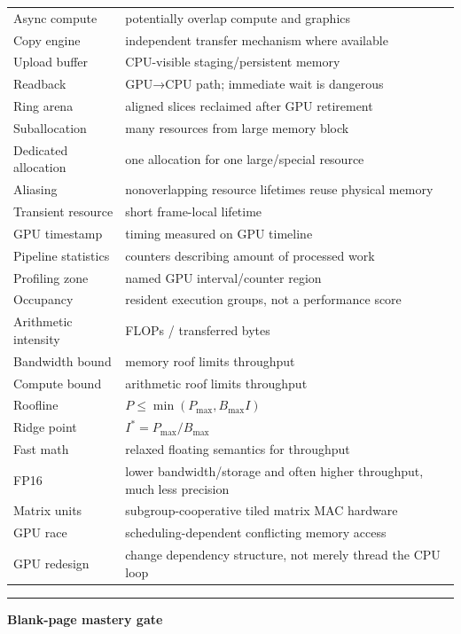 {\begin{longtable}[]{@{}
  >{\raggedright\arraybackslash}p{}
  >{\raggedright\arraybackslash}p{}@{}}
Async compute & potentially overlap compute and graphics \\
Copy engine & independent transfer mechanism where available \\
Upload buffer & CPU-visible staging/persistent memory \\
Readback & GPU→CPU path; immediate wait is dangerous \\
Ring arena & aligned slices reclaimed after GPU retirement \\
Suballocation & many resources from large memory block \\
Dedicated allocation & one allocation for one large/special resource \\
Aliasing & nonoverlapping resource lifetimes reuse physical memory \\
Transient resource & short frame-local lifetime \\
GPU timestamp & timing measured on GPU timeline \\
Pipeline statistics & counters describing amount of processed work \\
Profiling zone & named GPU interval/counter region \\
Occupancy & resident execution groups, not a performance score \\
Arithmetic intensity & FLOPs / transferred bytes \\
Bandwidth bound & memory roof limits throughput \\
Compute bound & arithmetic roof limits throughput \\
Roofline & \(P\le\min(P_{\max},B_{\max}I)\) \\
Ridge point & \(I^*=P_{\max}/B_{\max}\) \\
Fast math & relaxed floating semantics for throughput \\
FP16 & lower bandwidth/storage and often higher throughput, much less precision \\
Matrix units & subgroup-cooperative tiled matrix MAC hardware \\
GPU race & scheduling-dependent conflicting memory access \\
GPU redesign & change dependency structure, not merely thread the CPU loop \\
\end{longtable}
}

\begin{center}\rule{0.5\linewidth}{0.5pt}\end{center}

\textbf{Blank-page mastery gate}

